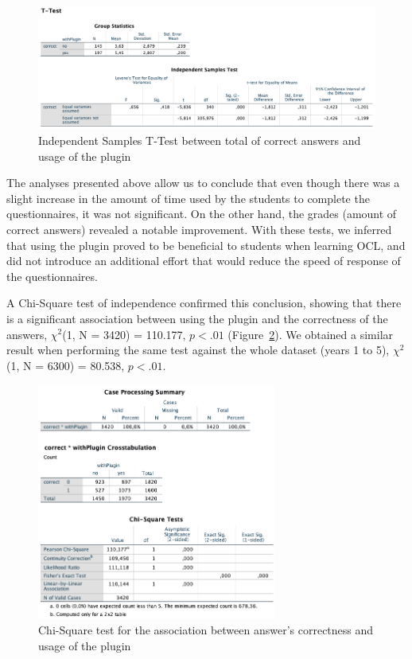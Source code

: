 \begin{figure}[ht]
\centering
\includegraphics[width=1\textwidth]{Template/Chapters/figures/6_Results/Section3/03_TTest_Correct.png}
\caption{Independent Samples T-Test between total of correct answers and usage of the plugin}
\label{fig:03_TTest_Correct}
\end{figure}

The analyses presented above allow us to conclude that even though there was a slight increase in the amount of time used by the students to complete the questionnaires, it was not significant. On the other hand, the grades (amount of correct answers) revealed a notable improvement. With these tests, we inferred that using the plugin proved to be beneficial to students when learning OCL, and did not introduce an additional effort that would reduce the speed of response of the questionnaires.

A Chi-Square test of independence confirmed this conclusion, showing that there is a significant association between using the plugin and the correctness of the answers, $\chi^{2}$(1, N = 3420) = 110.177, $p<.01$ (Figure~\ref{fig:03_Plugin_Chi_Square_Subset}). We obtained a similar result when performing the same test against the whole dataset (years 1 to 5), $\chi^{2}$(1, N = 6300) = 80.538, $p<.01$.

\begin{figure}[ht]
\centering
\includegraphics[width=0.7\textwidth]{Template/Chapters/figures/6_Results/Section3/03_Plugin_Chi_Square_Subset.png}
\caption{Chi-Square test for the association between answer's correctness and usage of the plugin}
\label{fig:03_Plugin_Chi_Square_Subset}
\end{figure}

